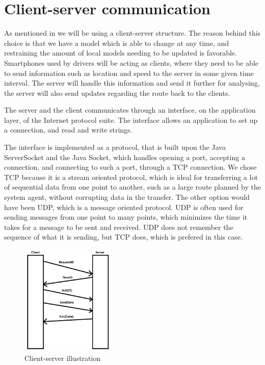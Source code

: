 \section{Client-server communication}
\label{chap:clientserver}
As mentioned in  we will be using a client-server structure.
The reason behind this choice is that we have a model which is able to change at any time, and restraining the amount of local models needing to be updated is favorable.
Smartphones used by drivers will be acting as clients,
where they need to be able to send information such as location and speed to the server in some given time interval.
The server will handle this information and send it further for analysing, the server will also send updates regarding the route back to the clients.

The server and the client communicates through an interface, on the application layer, of the Internet protocol suite.
The interface allows an application to set up a connection, and read and write strings.

The interface is implemented as a protocol, that is built upon the Java ServerSocket and the Java Socket,
which handles opening a port, accepting a connection, and connecting to such a port, through a TCP connection.
We chose TCP because it is a stream oriented protocol,
which is ideal for transferring a lot of sequential data from one point to another,
such as a large route planned by the system agent, without corrupting data in the transfer.
The other option would have been UDP, which is a message oriented protocol.
UDP is often used for sending messages from one point to many points,
which minimizes the time it takes for a message to be sent and received.
UDP does not remember the sequence of what it is sending, but TCP does, which is prefered in this case.

\begin{figure}[h!]
  \centering
    \includegraphics[width=0.4\textwidth]{figures/clientserver.png}
    \caption{Client-server illustration}
    \label{fig:clientserver}
\end{figure}

